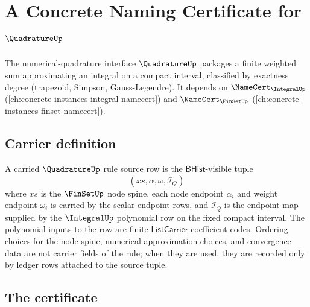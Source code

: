 \chapter{A Concrete Naming Certificate for $\QuadratureUp$}
\label{ch:concrete-instances-quadrature-namecert}

The numerical-quadrature interface $\QuadratureUp$ packages a finite weighted sum approximating an integral on a compact interval, classified by exactness degree (trapezoid, Simpson, Gauss-Legendre). It depends on $\NameCert_{\IntegralUp}$ (\autoref{ch:concrete-instances-integral-namecert}) and $\NameCert_{\FinSetUp}$ (\autoref{ch:concrete-instances-finset-namecert}).

\section{Carrier definition}
\label{sec:quadrature-carrier}

\begin{definition}
\label{def:quadrature-carried-rule-source-row}
A carried $\QuadratureUp$ rule source row is the $\mathsf{BHist}$-visible tuple
$$
(xs,\alpha,\omega,\mathcal I_Q)
$$
where $xs$ is the $\FinSetUp$ node spine, each node endpoint $\alpha_i$ and weight endpoint $\omega_i$ is carried by the scalar endpoint rows, and $\mathcal I_Q$ is the endpoint map supplied by the $\IntegralUp$ polynomial row on the fixed compact interval. The polynomial inputs to the row are finite $\mathsf{ListCarrier}$ coefficient codes. Ordering choices for the node spine, numerical approximation choices, and convergence data are not carrier fields of the rule; when they are used, they are recorded only by ledger rows attached to the source tuple.
\end{definition}

\section{The certificate}
\label{sec:quadrature-certificate}

